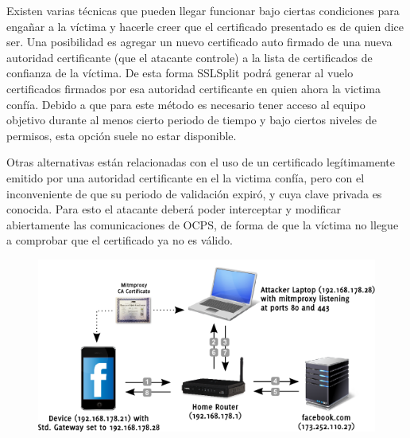 \documentclass[10pt,a4paper]{article}
\begin{document}
Existen varias técnicas que pueden llegar funcionar bajo ciertas condiciones para engañar a la víctima y hacerle creer que el certificado presentado es de quien dice ser. Una posibilidad es agregar un nuevo certificado auto firmado de una nueva autoridad certificante (que el atacante controle) a la lista de certificados de confianza de la víctima. De esta forma SSLSplit podrá generar al vuelo certificados firmados por esa autoridad certificante en quien ahora la victima confía. Debido a que para este método es necesario tener acceso al equipo objetivo durante al menos cierto periodo de tiempo y bajo ciertos niveles de permisos, esta opción suele no estar disponible. 

Otras alternativas están relacionadas con el uso de un certificado legítimamente emitido por una autoridad certificante en el la victima confía, pero con el inconveniente de que su periodo de validación expiró, y cuya clave privada es conocida. Para esto el atacante deberá poder interceptar y modificar abiertamente las comunicaciones de OCPS, de forma de que la víctima no llegue a comprobar que el certificado ya no es válido.


\begin{figure}[H]
\centerline{\includegraphics[scale=0.8]{images/sslsplit_diagram.png}}
\caption{}
\end{figure}
\end{document}
